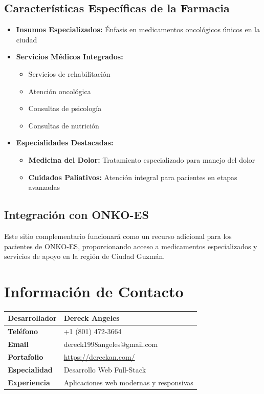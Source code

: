 \documentclass[12pt,a4paper]{article}
\begin{document}
\subsection{Características Específicas de la Farmacia}
\begin{itemize}
    \item \textbf{Insumos Especializados:} Énfasis en medicamentos oncológicos únicos en la ciudad
    \item \textbf{Servicios Médicos Integrados:}
    \begin{itemize}
        \item Servicios de rehabilitación
        \item Atención oncológica
        \item Consultas de psicología
        \item Consultas de nutrición
    \end{itemize}
    \item \textbf{Especialidades Destacadas:}
    \begin{itemize}
        \item \textbf{Medicina del Dolor:} Tratamiento especializado para manejo del dolor
        \item \textbf{Cuidados Paliativos:} Atención integral para pacientes en etapas avanzadas
    \end{itemize}
\end{itemize}

\subsection{Integración con ONKO-ES}
Este sitio complementario funcionará como un recurso adicional para los pacientes de ONKO-ES, proporcionando acceso a medicamentos especializados y servicios de apoyo en la región de Ciudad Guzmán.

\section{Información de Contacto}

\begin{center}
\begin{tabularx}{0.8\textwidth}{|l|X|}
\hline
\textbf{Desarrollador} & \textbf{Dereck Angeles} \\
\hline
\textbf{Teléfono} & +1 (801) 472-3664 \\
\hline
\textbf{Email} & dereck1998angeles@gmail.com \\
\hline
\textbf{Portafolio} & \url{https://dereckan.com/} \\
\hline
\textbf{Especialidad} & Desarrollo Web Full-Stack \\
\hline
\textbf{Experiencia} & Aplicaciones web modernas y responsivas \\
\hline
\end{tabularx}
\end{center}
\end{document}
